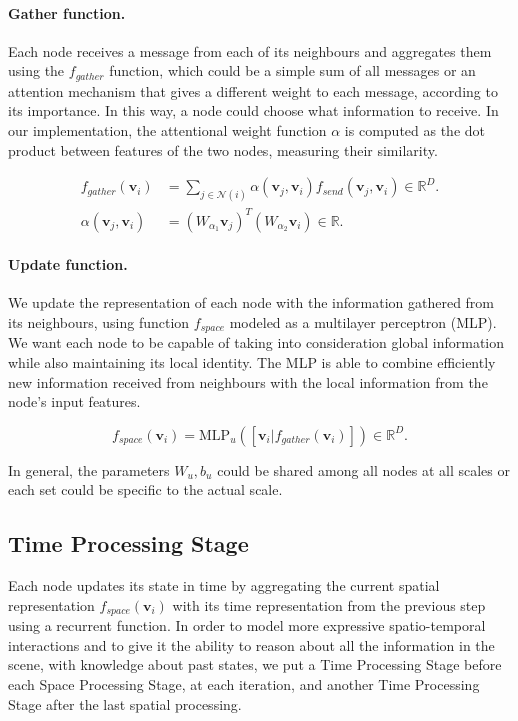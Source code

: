 \documentclass{article}
\begin{document}
\paragraph{Gather function.}
Each node receives a message from each of its neighbours and aggregates them using the $f_{gather}$ function, which could be a simple sum of all messages or an attention mechanism that gives a different weight to each message, according to its importance. In this way, a node could choose what information to receive. In our implementation, the attentional weight function $\alpha$ is computed as the dot product between features of the two nodes, measuring their similarity.

\begin{align}
    f_{gather}(\mathbf{v}_i) &= \sum_{j \in \mathcal{N}(i)} \alpha(\mathbf{v}_j,\mathbf{v}_i) f_{send}(\mathbf{v}_j,\mathbf{v}_i) \in \mathbb{R}^{D}.\\
    \alpha(\mathbf{v}_j,\mathbf{v}_i) &= (W_{\alpha_1} \mathbf{v}_j)^T (W_{\alpha_2} \mathbf{v}_i) \in \mathbb{R}.
\end{align}


\paragraph{Update function.} We update the representation of each node with the information gathered from its neighbours, using function $f_{space}$ modeled as a 
multilayer perceptron (MLP). We want each node to be capable of taking into consideration global information while also maintaining its local identity. The MLP is able to combine efficiently new information received from neighbours with the local information from the node's input features.

\begin{equation}
    f_{space}(\mathbf{v}_i) = \text{MLP}_u( [\mathbf{v}_i | f_{gather}(\mathbf{v}_i)])  \in \mathbb{R}^{D}.
\end{equation}

In general, the parameters $W_u, b_u$ could be shared among all nodes at all scales or each set could be specific to the actual scale. 

\subsection{Time Processing Stage}
Each node updates its state in time by aggregating the current spatial representation $f_{space}(\mathbf{v}_i)$ with its time representation from the previous step using a recurrent function.
In order to model more expressive spatio-temporal interactions and to give it the ability to reason about all the information in the scene, with knowledge about past states, we put a Time Processing Stage before each Space Processing Stage, at each iteration, and another Time Processing Stage after the last spatial processing.
\end{document}
